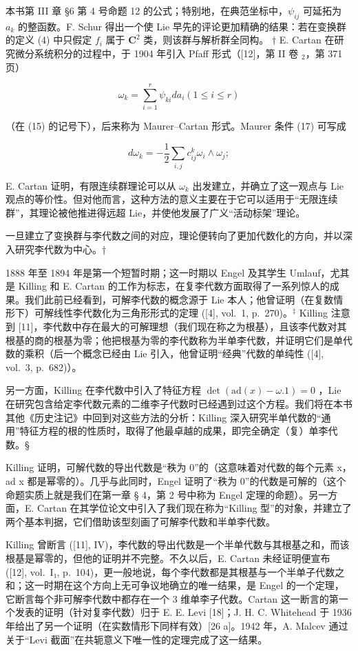 本书第 III 章 §6 第 4 号命题 12 的公式；特别地，在典范坐标中，\(\psi_{ij}\) 可延拓为 \(a_k\) 的整函数。F. Schur 得出一个使 Lie 早先的评论更加精确的结果：若在变换群的定义 (4) 中只假定 \(f_i\) 属于 \(\mathbf{C}^2\) 类，则该群与解析群全同构。 \(\dagger\) E. Cartan 在研究微分系统积分的过程中，于 1904 年引入 Pfaff 形式（{[}12{]}，第 II 卷 \(_{2}\)，第 371 页）

\[
\omega_ {k} = \sum_ {i = 1} ^ {r} \psi_ {k i} d a _ {i} (1 \leqslant i \leqslant r)\tag{25}
\]

（在 (15) 的记号下），后来称为 Maurer--Cartan 形式。Maurer 条件 (17) 可写成

\[
d \omega_ {k} = - \frac {1}{2} \sum_ {i, j} c _ {i j} ^ {k} \omega_ {i} \wedge \omega_ {j};
\]

E. Cartan 证明，有限连续群理论可以从 \(\omega_{k}\) 出发建立，并确立了这一观点与 Lie 观点的等价性。但对他而言，这种方法的意义主要在于它可以适用于“无限连续群”，其理论被他推进得远超 Lie，并使他发展了广义“活动标架”理论。


一旦建立了变换群与李代数之间的对应，理论便转向了更加代数化的方向，并以深入研究李代数为中心。†

1888 年至 1894 年是第一个短暂时期；这一时期以 Engel 及其学生 Umlauf，尤其是 Killing 和 E. Cartan 的工作为标志，在复李代数方面取得了一系列惊人的成果。我们此前已经看到，可解李代数的概念源于 Lie 本人；他曾证明（在复数情形下）可解线性李代数化为三角形形式的定理 ({[}4{]}, vol.~1, p.~270)。\(^{\ddagger}\) Killing 注意到 {[}11{]}，李代数中存在最大的可解理想（我们现在称之为根基），且该李代数对其根基的商的根基为零；他把根基为零的李代数称为半单李代数，并证明它们是单代数的乘积（后一个概念已经由 Lie 引入，他曾证明“经典”代数的单纯性 ({[}4{]}, vol.~3, p.~682)）。

另一方面，Killing 在李代数中引入了特征方程 \(\det(\mathrm{ad}(x)-\omega.1)=0\) ，Lie 在研究包含给定李代数元素的二维李子代数时已经遇到过这个方程。我们将在本书其他《历史注记》中回到对这些方法的分析：Killing 深入研究半单代数的“通用”特征方程的根的性质时，取得了他最卓越的成果，即完全确定（复）单李代数。§

Killing 证明，可解代数的导出代数是“秩为 0”的（这意味着对代数的每个元素 x，ad x 都是幂零的）。几乎与此同时，Engel 证明了“秩为 0”的代数是可解的（这个命题实质上就是我们在第一章 § 4，第 2 号中称为 Engel 定理的命题）。另一方面，E. Cartan 在其学位论文中引入了我们现在称为“Killing 型”的对象，并建立了两个基本判据，它们借助该型刻画了可解李代数和半单李代数。

Killing 曾断言 ({[}11{]}, IV)，李代数的导出代数是一个半单代数与其根基之和，而该根基是幂零的，但他的证明并不完整。不久以后，E. Cartan 未经证明便宣布 ({[}12{]}, vol.~I₁, p.~104)，更一般地说，每个李代数都是其根基与一个半单子代数之和；这一时期在这个方向上无可争议地确立的唯一结果，是 Engel 的一个定理，它断言每个非可解李代数中都存在一个 3 维单李子代数。Cartan 这一断言的第一个发表的证明（针对复李代数）归于 E. E. Levi {[}18{]}；J. H. C. Whitehead 于 1936 年给出了另一个证明（在实数情形下同样有效）{[}26 a{]}。1942 年，A. Malcev 通过关于“Levi 截面”在共轭意义下唯一性的定理完成了这一结果。

